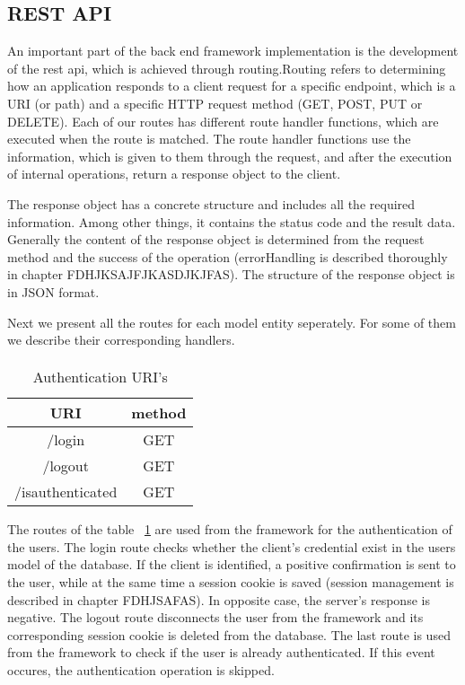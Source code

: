 \subsection{REST API}
An important part of the back end framework implementation is the development of the rest api, which is achieved through routing.Routing refers to determining how an application responds to a client request for a specific endpoint, which is a URI (or path) and a specific HTTP request method (GET, POST, PUT or DELETE). Each of our routes has different route handler functions, which are executed when the route is matched. The route handler functions use the information, which is given to them through the request, and after the execution of internal operations, return a response object to the client.\par
	 The response object has a concrete structure and includes all the required information. Among other things, it contains the status code and the result data. Generally the content of the response object is determined from the request method and the success of the operation (errorHandling is described thoroughly in chapter FDHJKSAJFJKASDJKJFAS). The structure of the response object is in JSON format. \par 
	 	Next we present all the routes for each model entity seperately. For some of them we describe their corresponding handlers.
	 	
\paragraph{}
\begin{table}[]
\centering
\begin{tabular}{|c|c|}
\hline
\rowcolor[HTML]{32CB00} 
\textbf{URI}     & \textbf{method} \\ \hline
\rowcolor[HTML]{FFFFFF} 
/login           & GET             \\ \hline
\rowcolor[HTML]{67FD9A} 
/logout          & GET             \\ \hline
\rowcolor[HTML]{FFFFFF} 
/isauthenticated & GET             \\ \hline
\end{tabular}
\caption{Authentication URI's}
\label{authURI}
\end{table}
The routes of the table ~\ref{authURI} are used from the framework for the authentication of the users. The login route checks whether the client's credential exist in the users model of the database. If the client is identified, a positive confirmation is sent to the user, while at the same time a session cookie is saved (session management is described in chapter FDHJSAFAS). In opposite case, the server's response is negative. The logout route disconnects the user from the framework and its corresponding session cookie is deleted from the database. The last route is used from the framework to check if the user is already authenticated. If this event occures, the authentication operation is skipped.

